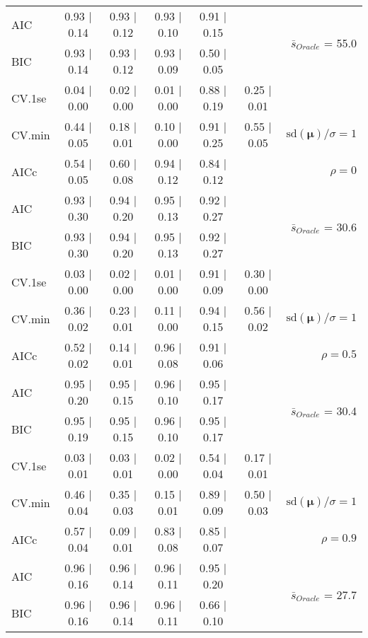 \begin{table}
\begin{center}
\begin{tabular}{l*{5}{c}|r}
AIC & 0.93 $\mid$ 0.14 & 0.93 $\mid$ 0.12 & 0.93 $\mid$ 0.10 & 0.91 $\mid$ 0.15 & &  \multirow{2}{*}{$\bar{s}_{Oracle}$ = 55.0} \\
BIC & 0.93 $\mid$ 0.14 & 0.93 $\mid$ 0.12 & 0.93 $\mid$ 0.09 & 0.50 $\mid$ 0.05 & &  \\
 \hline 
CV.1se & 0.04 $\mid$ 0.00 & 0.02 $\mid$ 0.00 & 0.01 $\mid$ 0.00 & 0.88 $\mid$ 0.19 & 0.25 $\mid$ 0.01 & \\
CV.min & 0.44 $\mid$ 0.05 & 0.18 $\mid$ 0.01 & 0.10 $\mid$ 0.00 & 0.91 $\mid$ 0.25 & 0.55 $\mid$ 0.05 &  $\mathrm{sd}(\mathbf{\mu})/\sigma=1$ \\
AICc & 0.54 $\mid$ 0.05 & 0.60 $\mid$ 0.08 & 0.94 $\mid$ 0.12 & 0.84 $\mid$ 0.12 & & $\rho=0$ \\
AIC & 0.93 $\mid$ 0.30 & 0.94 $\mid$ 0.20 & 0.95 $\mid$ 0.13 & 0.92 $\mid$ 0.27 & &  \multirow{2}{*}{$\bar{s}_{Oracle}$ = 30.6} \\
BIC & 0.93 $\mid$ 0.30 & 0.94 $\mid$ 0.20 & 0.95 $\mid$ 0.13 & 0.92 $\mid$ 0.27 & &  \\
 \hline 
CV.1se & 0.03 $\mid$ 0.00 & 0.02 $\mid$ 0.00 & 0.01 $\mid$ 0.00 & 0.91 $\mid$ 0.09 & 0.30 $\mid$ 0.00 & \\
CV.min & 0.36 $\mid$ 0.02 & 0.23 $\mid$ 0.01 & 0.11 $\mid$ 0.00 & 0.94 $\mid$ 0.15 & 0.56 $\mid$ 0.02 &  $\mathrm{sd}(\mathbf{\mu})/\sigma=1$ \\
AICc & 0.52 $\mid$ 0.02 & 0.14 $\mid$ 0.01 & 0.96 $\mid$ 0.08 & 0.91 $\mid$ 0.06 & & $\rho=0.5$ \\
AIC & 0.95 $\mid$ 0.20 & 0.95 $\mid$ 0.15 & 0.96 $\mid$ 0.10 & 0.95 $\mid$ 0.17 & &  \multirow{2}{*}{$\bar{s}_{Oracle}$ = 30.4} \\
BIC & 0.95 $\mid$ 0.19 & 0.95 $\mid$ 0.15 & 0.96 $\mid$ 0.10 & 0.95 $\mid$ 0.17 & &  \\
 \hline 
CV.1se & 0.03 $\mid$ 0.01 & 0.03 $\mid$ 0.01 & 0.02 $\mid$ 0.00 & 0.54 $\mid$ 0.04 & 0.17 $\mid$ 0.01 & \\
CV.min & 0.46 $\mid$ 0.04 & 0.35 $\mid$ 0.03 & 0.15 $\mid$ 0.01 & 0.89 $\mid$ 0.09 & 0.50 $\mid$ 0.03 &  $\mathrm{sd}(\mathbf{\mu})/\sigma=1$ \\
AICc & 0.57 $\mid$ 0.04 & 0.09 $\mid$ 0.01 & 0.83 $\mid$ 0.08 & 0.85 $\mid$ 0.07 & & $\rho=0.9$ \\
AIC & 0.96 $\mid$ 0.16 & 0.96 $\mid$ 0.14 & 0.96 $\mid$ 0.11 & 0.95 $\mid$ 0.20 & &  \multirow{2}{*}{$\bar{s}_{Oracle}$ = 27.7} \\
BIC & 0.96 $\mid$ 0.16 & 0.96 $\mid$ 0.14 & 0.96 $\mid$ 0.11 & 0.66 $\mid$ 0.10 & &  \\

\end{tabular}
\end{center}
\end{table}
